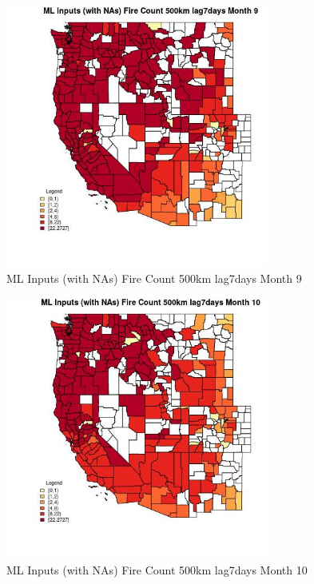 \clearpage 

\begin{figure} 
\centering  
\includegraphics[width=0.77\textwidth]{Code_Outputs/Report_ML_input_PM25_Step4_part_f_de_duplicated_aveswNAs_CountyFire_Count_500km_lag7daysmedianMonth9.jpg} 
\caption{\label{fig:Report_ML_input_PM25_Step4_part_f_de_duplicated_aveswNAsCountyFire_Count_500km_lag7daysmedianMonth9}ML Inputs (with NAs) Fire Count 500km lag7days Month 9} 
\end{figure} 
 

\begin{figure} 
\centering  
\includegraphics[width=0.77\textwidth]{Code_Outputs/Report_ML_input_PM25_Step4_part_f_de_duplicated_aveswNAs_CountyFire_Count_500km_lag7daysmedianMonth10.jpg} 
\caption{\label{fig:Report_ML_input_PM25_Step4_part_f_de_duplicated_aveswNAsCountyFire_Count_500km_lag7daysmedianMonth10}ML Inputs (with NAs) Fire Count 500km lag7days Month 10} 
\end{figure} 
 

